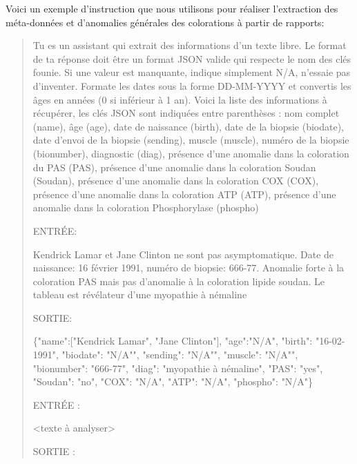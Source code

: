 Voici un exemple d'instruction que nous utilisons pour réaliser l'extraction des méta-données et d'anomalies générales des colorations à partir de rapports:
\begin{quote}
Tu es un assistant qui extrait des informations d'un texte libre. Le format de ta réponse doit être un format JSON valide qui respecte le nom des clés founie. Si une valeur est manquante, indique simplement N/A, n'essaie pas d'inventer. Formate les dates sous la forme DD-MM-YYYY et convertis les âges en années (0 si inférieur à 1 an). Voici la liste des informations à récupérer, les clés JSON sont indiquées entre parenthèses : nom complet (name), âge (age), date de naissance (birth), date de la biopsie (biodate), date d'envoi de la biopsie (sending), muscle (muscle), numéro de la biopsie (bionumber), diagnostic (diag), présence d'une anomalie dans la coloration du PAS (PAS), présence d'une anomalie dans la coloration Soudan (Soudan), présence d'une anomalie dans la coloration COX (COX), présence d'une anomalie dans la coloration ATP (ATP), présence d'une anomalie dans la coloration Phosphorylase (phospho)

ENTRÉE:

Kendrick Lamar et Jane Clinton ne sont pas asymptomatique. Date de naissance: 16 février 1991, numéro de biopsie: 666-77. Anomalie forte à la coloration PAS mais pas d'anomalie à la coloration lipide soudan. Le tableau est révélateur d'une myopathie à némaline

SORTIE:

\{"name":["Kendrick Lamar", "Jane Clinton"], "age":"N/A", "birth": "16-02-1991", "biodate": "N/A"", "sending": "N/A"", "muscle": "N/A"", "bionumber": "666-77", "diag": "myopathie à némaline", "PAS": "yes", "Soudan": "no", "COX": "N/A", "ATP": "N/A", "phospho": "N/A"\}

ENTRÉE :

<texte à analyser>

SORTIE :
\end{quote}

